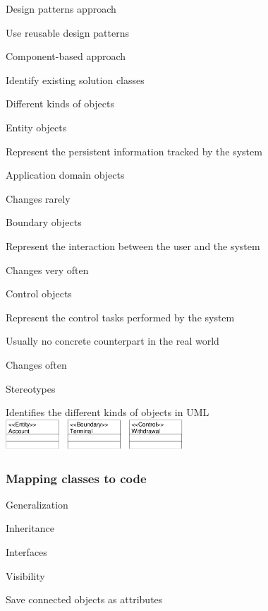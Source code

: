	\item Design patterns approach
	\enumstart
		\item Use reusable design patterns
	\enumend

	\item Component-based approach
	\enumstart
		\item Identify existing solution classes
	\enumend

	\item Different kinds of objects
	\enumstart
		\item Entity objects
		\enumstart
			\item Represent the persistent information tracked by the system
			\item Application domain objects
			\item Changes rarely
		\enumend
		\item Boundary objects
		\enumstart
			\item Represent the interaction between the user and the system
			\item Changes very often
		\enumend
		\item Control objects
		\enumstart
			\item Represent the control tasks performed by the system
			\item Usually no concrete counterpart in the real world
			\item Changes often
		\enumend
	\enumend
	\item Stereotypes
	\enumstart
		\item Identifies the different kinds of objects in UML
		\\ \includegraphics[width=0.5\textwidth]{img/stereotypes.png}
	\enumend
\enumend

\subsubsection{Mapping classes to code}
\enumstart
	\item Generalization
	\enumstart
		\item Inheritance
		\item Interfaces
	\enumend

	\item Visibility
	\enumstart
		\item Save connected objects as attributes
	\enumend

